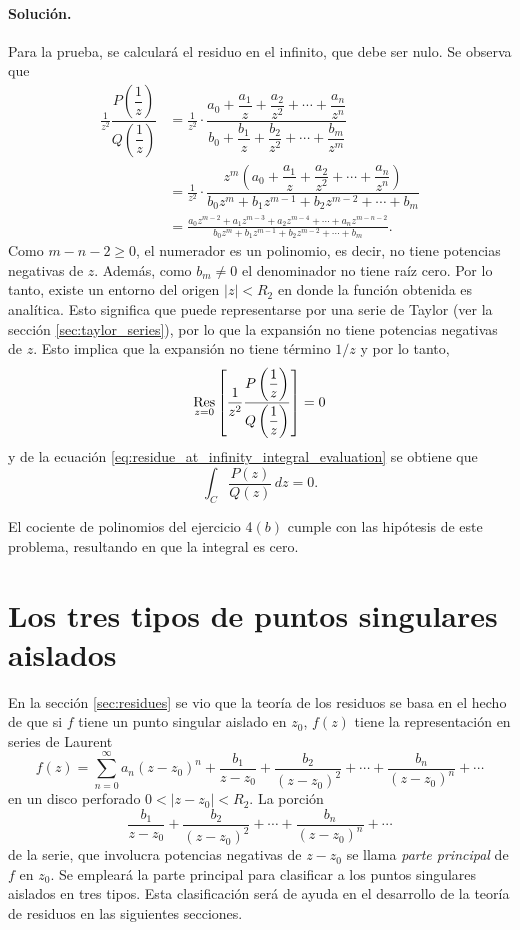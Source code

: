 \documentclass[a4paper]{report}
\def\Res{\qopname\relax m{Res}}
\begin{document}
\paragraph{Solución.} Para la prueba, se calculará el residuo en el infinito, que debe ser nulo. Se observa que 
\begin{align*}
 \frac{1}{z^2}\dfrac{P\left(\dfrac{1}{z}\right)}{Q\left(\dfrac{1}{z}\right)}
    &=\frac{1}{z^2}\cdot\dfrac{a_0+\dfrac{a_1}{z}+\dfrac{a_2}{z^2}+\cdots+\dfrac{a_n}{z^n}}{b_0+\dfrac{b_1}{z}+\dfrac{b_2}{z^2}+\cdots+\dfrac{b_m}{z^m}}\\
    &=\frac{1}{z^2}\cdot\dfrac{z^m\left(a_0+\dfrac{a_1}{z}+\dfrac{a_2}{z^2}+\cdots+\dfrac{a_n}{z^n}\right)}{b_0z^m+b_1z^{m-1}+b_2z^{m-2}+\cdots+b_m}\\
    &=\frac{a_0z^{m-2}+a_1z^{m-3}+a_2z^{m-4}+\cdots+a_nz^{m-n-2}}{b_0z^m+b_1z^{m-1}+b_2z^{m-2}+\cdots+b_m}.
\end{align*}
Como \(m-n-2\geq0\), el numerador es un polinomio, es decir, no tiene potencias negativas de \(z\). Además, como \(b_m\neq0\) el denominador no tiene raíz cero. Por lo tanto, existe un entorno del origen \(|z|<R_2\) en donde la función obtenida es analítica. Esto significa que puede representarse por una serie de Taylor (ver la sección \ref{sec:taylor_series}), por lo que la expansión no tiene potencias negativas de \(z\). Esto implica que la expansión no tiene término \(1/z\) y por lo tanto,
\[
 \Res_{z=0}\left[\frac{1}{z^2}\dfrac{P\left(\dfrac{1}{z}\right)}{Q\left(\dfrac{1}{z}\right)}\right]=0
\]
y de la ecuación \ref{eq:residue_at_infinity_integral_evaluation} se obtiene que 
\[
 \int_C\frac{P(z)}{Q(z)}\,dz=0.
\]

El cociente de polinomios del ejercicio 4\((b)\) cumple con las hipótesis de este problema, resultando en que la integral es cero.

\section{Los tres tipos de puntos singulares aislados}\label{sec:isolated_singular_points_types}

En la sección \ref{sec:residues} se vio que la teoría de los residuos se basa en el hecho de que si \(f\) tiene un punto singular aislado en \(z_0\), \(f(z)\) tiene la representación en series de Laurent
\begin{equation}\label{eq:residues_laurent_expansion_2}
 f(z)=\sum_{n=0}^\infty a_n(z-z_0)^n+\frac{b_1}{z-z_0}+\frac{b_2}{(z-z_0)^2}+\cdots+\frac{b_n}{(z-z_0)^n}+\cdots 
\end{equation}
en un disco perforado \(0<|z-z_0|<R_2\). La porción 
\begin{equation}\label{eq:series_principal_part}
 \frac{b_1}{z-z_0}+\frac{b_2}{(z-z_0)^2}+\cdots+\frac{b_n}{(z-z_0)^n}+\cdots 
\end{equation}
de la serie, que involucra potencias negativas de \(z-z_0\) se llama \emph{parte principal} de \(f\) en \(z_0\). Se empleará la parte principal para clasificar a los puntos singulares aislados en tres tipos. Esta clasificación será de ayuda en el desarrollo de la teoría de residuos en las siguientes secciones.
\end{document}
